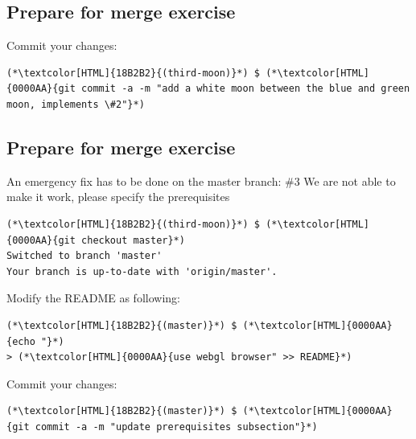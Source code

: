 \subsection{Prepare for merge exercise}
\begin{frame}[fragile]
  \subslidetitle

  Commit your changes:
  \begin{lstlisting}
(*\textcolor[HTML]{18B2B2}{(third-moon)}*) $ (*\textcolor[HTML]{0000AA}{git commit -a -m "add a white moon between the blue and green moon, implements \#2"}*)
\end{lstlisting}

\end{frame}


\subsection{Prepare for merge exercise}
\begin{frame}[fragile]
  \subslidetitle

  An emergency fix has to be done on the master branch:
  \newline \vspace{1em}
  \#3 We are not able to make it work, please specify the prerequisites
  \begin{lstlisting}
(*\textcolor[HTML]{18B2B2}{(third-moon)}*) $ (*\textcolor[HTML]{0000AA}{git checkout master}*)
Switched to branch 'master'
Your branch is up-to-date with 'origin/master'.
\end{lstlisting}

  Modify the README as following:
  \begin{lstlisting}
(*\textcolor[HTML]{18B2B2}{(master)}*) $ (*\textcolor[HTML]{0000AA}{echo "}*)
> (*\textcolor[HTML]{0000AA}{use webgl browser" >> README}*)
\end{lstlisting}

  Commit your changes:
  \begin{lstlisting}
(*\textcolor[HTML]{18B2B2}{(master)}*) $ (*\textcolor[HTML]{0000AA}{git commit -a -m "update prerequisites subsection"}*)
\end{lstlisting}

\end{frame}
